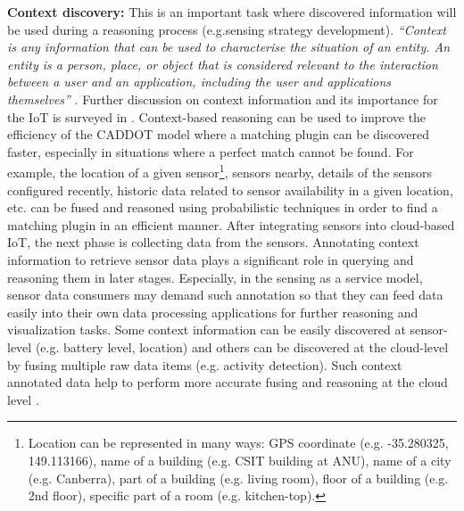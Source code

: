 \documentclass[graybox]{svmult}
\begin{document}
\textbf{Context discovery:} This is an important task where discovered information will be used during a reasoning process (e.g.sensing strategy development). \textit{``Context is any information that can be used to characterise the situation of an entity. An entity is a person, place, or object that is considered relevant to the interaction between a user and an application, including the user and applications themselves''} \cite{P104}. Further discussion on context information and its importance for the IoT is surveyed in \cite{ZMP007}. Context-based reasoning can be used to improve the efficiency of the CADDOT model where a matching plugin can be discovered faster, especially in situations where a perfect match cannot be found. For example, the location of a given sensor\footnote{Location can be represented in many ways: GPS coordinate (e.g. -35.280325, 149.113166), name of a building (e.g. CSIT building  at ANU), name of a city (e.g. Canberra), part of a building  (e.g. living room), floor of a building (e.g. 2nd floor), specific part of a room (e.g. kitchen-top).}, sensors nearby, details of the sensors configured recently, historic data related to sensor availability in a given location, etc. can be fused and reasoned using probabilistic techniques in order to find a matching plugin in an efficient manner. After integrating sensors into cloud-based IoT, the next phase is collecting data from the sensors. Annotating context information to retrieve  sensor data plays a significant role in querying and reasoning them in later stages. Especially, in the sensing as a service model, sensor data consumers may demand such annotation so that they can feed data easily into their own data processing applications for further reasoning and visualization tasks. Some context information can be easily discovered at sensor-level (e.g. battery level, location) and others can be discovered at the cloud-level by fusing multiple raw data items (e.g. activity detection). Such context annotated data help to perform more accurate fusing and reasoning at the  cloud level \cite{E7}.
\end{document}
